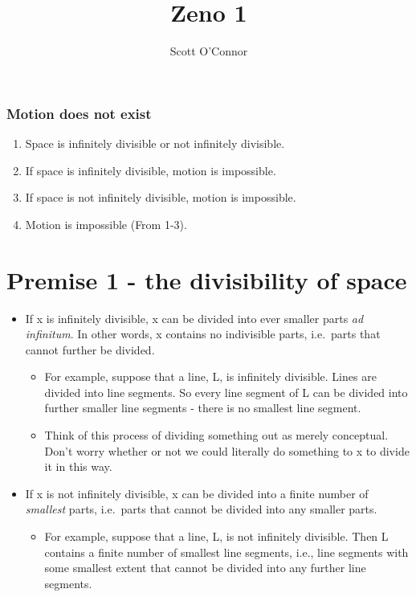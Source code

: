 \documentclass[]{article}
\title{Zeno 1}
\author{Scott O'Connor}
\date{}
\begin{document}
\maketitle

\subsubsection{Motion does not exist}\label{motion-does-not-exist}

\begin{enumerate}
\def\labelenumi{\arabic{enumi}.}
\item
  Space is infinitely divisible or not infinitely divisible.
\item
  If space is infinitely divisible, motion is impossible.
\item
  If space is not infinitely divisible, motion is impossible.
\item
  Motion is impossible (From 1-3).
\end{enumerate}

\section{Premise 1 - the divisibility of
space}\label{premise-1---the-divisibility-of-space}

\begin{itemize}
\item
  If x is infinitely divisible, x can be divided into ever smaller parts
  \emph{ad infinitum}. In other words, x contains no indivisible parts,
  i.e.~parts that cannot further be divided.

  \begin{itemize}
  \item
    For example, suppose that a line, L, is infinitely divisible. Lines
    are divided into line segments. So every line segment of L can be
    divided into further smaller line segments - there is no smallest
    line segment.
  \item
    Think of this process of dividing something out as merely
    conceptual. Don't worry whether or not we could literally do
    something to x to divide it in this way.
  \end{itemize}
\item
  If x is not infinitely divisible, x can be divided into a finite
  number of \emph{smallest} parts, i.e.~parts that cannot be divided
  into any smaller parts.

  \begin{itemize}
  \itemsep1pt\parskip0pt
  \item
    For example, suppose that a line, L, is not infinitely divisible.
    Then L contains a finite number of smallest line segments, i.e.,
    line segments with some smallest extent that cannot be divided into
    any further line segments.
  \end{itemize}
\end{itemize}
\end{document}
